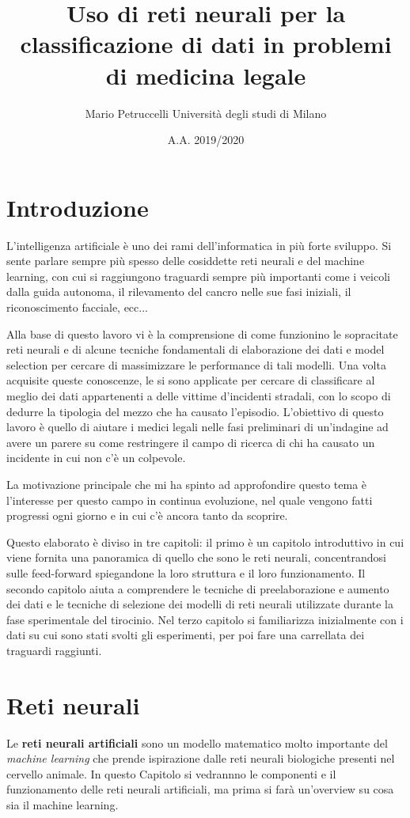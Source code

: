 \documentclass[12pt, twoside, letterpaper]{report}
\title{Uso di reti neurali per la classificazione di dati in problemi di medicina legale}
\author{Mario Petruccelli \cr Università degli studi di Milano}
\date{A.A. 2019/2020}
\begin{document}
	\begin{titlepage}
		
		\newpage
		\tableofcontents
		\thispagestyle{empty}
	\end{titlepage}

	\chapter*{Introduzione}     
		L'intelligenza artificiale è uno dei rami dell'informatica in più forte sviluppo. Si sente parlare sempre più spesso delle cosiddette reti neurali e del machine learning, con cui si raggiungono traguardi sempre più importanti come i veicoli dalla guida autonoma, il rilevamento del cancro nelle sue fasi iniziali, il riconoscimento facciale, ecc... 

		Alla base di questo lavoro vi è la comprensione di come funzionino le sopracitate reti neurali e di alcune tecniche fondamentali di elaborazione dei dati e model selection per cercare di massimizzare le performance di tali modelli. Una volta acquisite queste conoscenze, le si sono applicate per cercare di classificare al meglio dei dati appartenenti a delle vittime d'incidenti stradali, con lo scopo di dedurre la tipologia del mezzo che ha causato l'episodio. L'obiettivo di questo lavoro è quello di aiutare i medici legali nelle fasi preliminari di un'indagine ad avere un parere su come restringere il campo di ricerca di chi ha causato un incidente in cui non c'è un colpevole. 

		La motivazione principale che mi ha spinto ad approfondire questo tema è l'interesse per questo campo in continua evoluzione, nel quale vengono fatti progressi ogni giorno e in cui c'è ancora tanto da scoprire.

		Questo elaborato è diviso in tre capitoli: il primo è un capitolo introduttivo in cui viene fornita una panoramica di quello che sono le reti neurali, concentrandosi sulle feed-forward spiegandone la loro struttura e il loro funzionamento. Il secondo capitolo aiuta a comprendere le tecniche di preelaborazione e aumento dei dati e le tecniche di selezione dei modelli di reti neurali utilizzate durante la fase sperimentale del tirocinio. Nel terzo capitolo si familiarizza inizialmente con i dati su cui sono stati svolti gli esperimenti, per poi fare una carrellata dei traguardi raggiunti. 

		\newpage		
	\chapter{Reti neurali}
		Le \textbf{reti neurali artificiali} sono un modello matematico molto importante del \textit{machine learning} che prende ispirazione dalle reti neurali biologiche presenti nel cervello animale. In questo Capitolo si vedrannno le componenti e il funzionamento delle reti neurali artificiali, ma prima si farà un'overview su cosa sia il machine learning.
\end{document}
